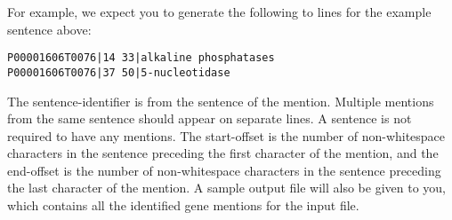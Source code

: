 For example, we expect you to generate the following to lines for the example
sentence above:

\begin{verbatim}
P00001606T0076|14 33|alkaline phosphatases
P00001606T0076|37 50|5-nucleotidase
\end{verbatim}

The sentence-identifier is from the sentence of the mention. Multiple mentions
from the same sentence should appear on separate lines. A sentence is not
required to have any mentions. The start-offset is the number of non-whitespace
characters in the sentence preceding the first character of the mention, and the
end-offset is the number of non-whitespace characters in the sentence preceding
the last character of the mention. A sample output file will also be given to
you, which contains all the identified gene mentions for the input file.
